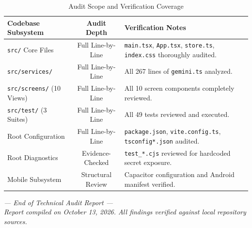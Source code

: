\documentclass[10pt,a4paper]{report}
\begin{document}
\begin{table}[htbp]
\centering
\small
\caption{Audit Scope and Verification Coverage}
\begin{tabularx}{\textwidth}{l c X}
\toprule
\textbf{Codebase Subsystem} & \textbf{Audit Depth} & \textbf{Verification Notes} \\
\midrule
\texttt{src/} Core Files & Full Line-by-Line & \texttt{main.tsx}, \texttt{App.tsx}, \texttt{store.ts}, \texttt{index.css} thoroughly audited. \\
\texttt{src/services/} & Full Line-by-Line & All 267 lines of \texttt{gemini.ts} analyzed. \\
\texttt{src/screens/} (10 Views) & Full Line-by-Line & All 10 screen components completely reviewed. \\
\texttt{src/test/} (3 Suites) & Full Line-by-Line & All 49 tests reviewed and executed. \\
Root Configuration & Full Line-by-Line & \texttt{package.json}, \texttt{vite.config.ts}, \texttt{tsconfig*.json} audited. \\
Root Diagnostics & Evidence-Checked & \texttt{test\_*.cjs} reviewed for hardcoded secret exposure. \\
Mobile Subsystem & Structural Review & Capacitor configuration and Android manifest verified. \\
\bottomrule
\end{tabularx}
\end{table}

\vspace{1cm}
\begin{center}
\itshape\small
--- End of Technical Audit Report --- \\
Report compiled on October 13, 2026. All findings verified against local repository sources.
\end{center}
\end{document}
